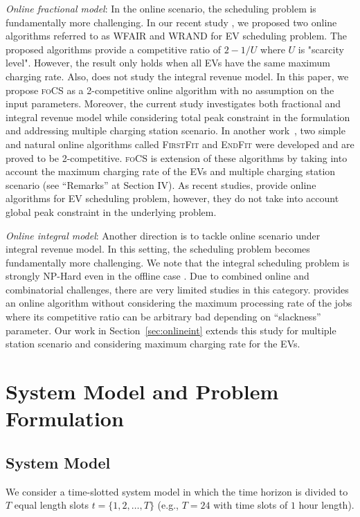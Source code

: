 \documentclass[journal]{IEEEtran}
\newcommand{\focs}{\textsc{foCS}\xspace}
\begin{document}
{\textit{Online fractional model}: In the online scenario, the scheduling problem is fundamentally more challenging. In our recent study \cite{alinia2018competitive}, 
we proposed two online algorithms referred to as WFAIR and WRAND for EV scheduling problem. The proposed algorithms provide a competitive ratio of $2-1/U$ where $U$ is "scarcity level". However, the result only holds when all EVs have the same maximum charging rate. Also, \cite{alinia2018competitive} does not study the integral revenue model. In this paper, we propose \focs as a 2-competitive online algorithm with no assumption on the input parameters. Moreover, the current study investigates both fractional and integral revenue model while considering total peak constraint in the formulation and addressing multiple charging station scenario. 
In another work~\cite{firstfit}, two simple and natural online algorithms called \textsc{FirstFit} and \textsc{EndFit} were developed and are proved to be 2-competitive. \focs is extension of these algorithms by taking into account the maximum charging rate of the EVs and multiple charging station scenario (see ``Remarks'' at Section IV). As recent studies, \cite{zheng2016online,deng2016whether} provide online algorithms for EV scheduling problem, however, they do not take into account global peak constraint in the underlying problem. 

\textit{Online integral model}: Another direction is to tackle online scenario under integral revenue model. In this setting, the scheduling problem becomes fundamentally more challenging. We note that the integral scheduling problem is strongly NP-Hard even in the offline case \cite{de2018complexity}. Due to combined online and combinatorial challenges, there are very limited studies in this category. \cite{lucier2013efficient} provides an online algorithm without considering the maximum processing rate of the jobs where its competitive ratio can be arbitrary bad depending on ``slackness'' parameter. 
Our work in Section~\ref{sec:onlineint} extends this study for multiple station scenario and considering maximum charging rate for the EVs.
}

\section{System Model and Problem Formulation}
		\label{sec:model}
		
		
		
		\subsection{System Model}
		We consider a time-slotted system model in which the time horizon is divided to $T$ equal length slots ${t=\{1, 2, \dots ,T\}}$ (e.g., $T=24$ with time slots of $1$ hour length).
\end{document}
